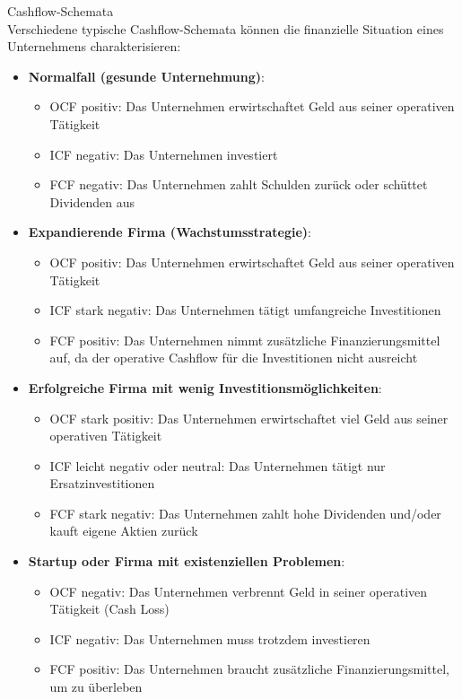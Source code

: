 \begin{concept}{Cashflow-Schemata}\\
Verschiedene typische Cashflow-Schemata können die finanzielle Situation eines Unternehmens charakterisieren:
\begin{itemize}
    \item \textbf{Normalfall (gesunde Unternehmung)}: 
    \begin{itemize}
        \item OCF positiv: Das Unternehmen erwirtschaftet Geld aus seiner operativen Tätigkeit
        \item ICF negativ: Das Unternehmen investiert
        \item FCF negativ: Das Unternehmen zahlt Schulden zurück oder schüttet Dividenden aus
    \end{itemize}
    \item \textbf{Expandierende Firma (Wachstumsstrategie)}:
    \begin{itemize}
        \item OCF positiv: Das Unternehmen erwirtschaftet Geld aus seiner operativen Tätigkeit
        \item ICF stark negativ: Das Unternehmen tätigt umfangreiche Investitionen
        \item FCF positiv: Das Unternehmen nimmt zusätzliche Finanzierungsmittel auf, da der operative Cashflow für die Investitionen nicht ausreicht
    \end{itemize}
    \item \textbf{Erfolgreiche Firma mit wenig Investitionsmöglichkeiten}:
    \begin{itemize}
        \item OCF stark positiv: Das Unternehmen erwirtschaftet viel Geld aus seiner operativen Tätigkeit
        \item ICF leicht negativ oder neutral: Das Unternehmen tätigt nur Ersatzinvestitionen
        \item FCF stark negativ: Das Unternehmen zahlt hohe Dividenden und/oder kauft eigene Aktien zurück
    \end{itemize}
    \item \textbf{Startup oder Firma mit existenziellen Problemen}:
    \begin{itemize}
        \item OCF negativ: Das Unternehmen verbrennt Geld in seiner operativen Tätigkeit (Cash Loss)
        \item ICF negativ: Das Unternehmen muss trotzdem investieren
        \item FCF positiv: Das Unternehmen braucht zusätzliche Finanzierungsmittel, um zu überleben
    \end{itemize}
\end{itemize}
\end{concept}

